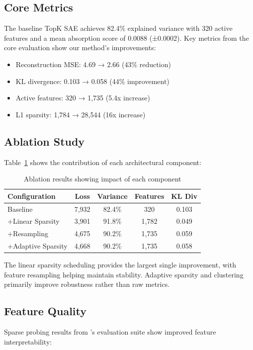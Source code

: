 \documentclass{article} %
\begin{document}
\subsection{Core Metrics}
The baseline TopK SAE achieves 82.4\% explained variance with 320 active features and a mean absorption score of 0.0088 (±0.0002). Key metrics from the core evaluation show our method's improvements:

\begin{itemize}
    \item Reconstruction MSE: 4.69 → 2.66 (43\% reduction)
    \item KL divergence: 0.103 → 0.058 (44\% improvement) 
    \item Active features: 320 → 1,735 (5.4x increase)
    \item L1 sparsity: 1,784 → 28,544 (16x increase)
\end{itemize}

\subsection{Ablation Study}
Table~\ref{tab:ablation} shows the contribution of each architectural component:

\begin{table}[h]
\centering
\caption{Ablation results showing impact of each component}
\label{tab:ablation}
\begin{tabular}{lcccc}
\toprule
Configuration & Loss & Variance & Features & KL Div \\
\midrule
Baseline & 7,932 & 82.4\% & 320 & 0.103 \\
+Linear Sparsity & 3,901 & 91.8\% & 1,782 & 0.049 \\
+Resampling & 4,675 & 90.2\% & 1,735 & 0.059 \\
+Adaptive Sparsity & 4,668 & 90.2\% & 1,735 & 0.058 \\
\bottomrule
\end{tabular}
\end{table}

The linear sparsity scheduling provides the largest single improvement, with feature resampling helping maintain stability. Adaptive sparsity and clustering primarily improve robustness rather than raw metrics.

\subsection{Feature Quality}
Sparse probing results from \cite{gurneeFindingNeuronsHaystack2023}'s evaluation suite show improved feature interpretability:
\end{document}
